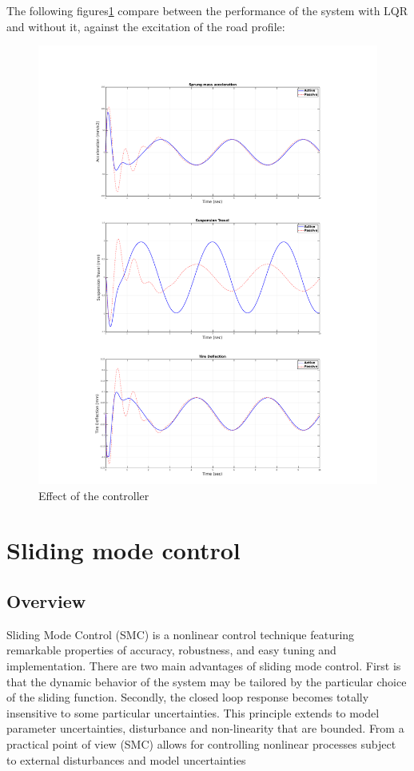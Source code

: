 \newpage
The following figures\ref{fig:all-road} compare between the performance of the system with LQR and without it, against the excitation of the road profile:
\begin{figure}[H]
	\centering
	\includegraphics[trim=0cm 2cm 0cm 2cm, clip, width=1\linewidth]{figures/p-a-road.pdf}
	\caption{Effect of the controller}
	\label{fig:all-road}
\end{figure}

\newpage
\section{Sliding mode control}
\subsection{Overview}
Sliding Mode Control (SMC) is a nonlinear control technique featuring
remarkable properties of accuracy, robustness, and easy tuning and implementation. There are
two main advantages of sliding mode control. First is that the dynamic behavior of the system may
be tailored by the particular choice of the sliding function. Secondly, the closed loop response
becomes totally insensitive to some particular uncertainties. This principle extends to model
parameter uncertainties, disturbance and non-linearity that are bounded. From a practical point
of view (SMC) allows for controlling nonlinear processes subject to external disturbances and
model uncertainties
